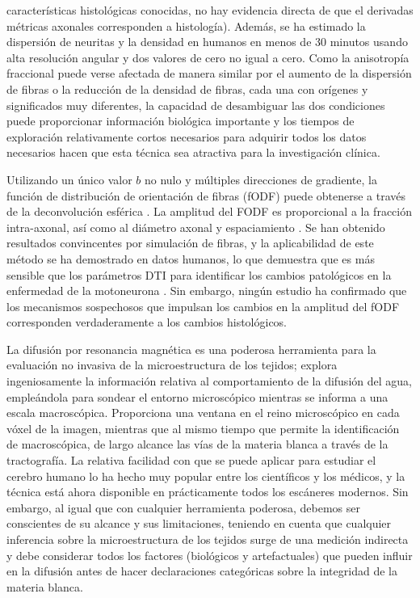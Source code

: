 características histológicas conocidas, no hay evidencia directa de que el derivadas métricas axonales corresponden a histología). Además, se ha estimado la dispersión de neuritas y la densidad \cite{127} en humanos en menos de 30 minutos usando alta resolución angular y dos valores de cero no igual a cero. Como la anisotropía fraccional puede verse afectada de manera similar por el aumento de la dispersión de fibras o la reducción de la densidad de fibras, cada una con orígenes y significados muy diferentes, la capacidad de desambiguar las dos condiciones puede proporcionar información biológica importante y los tiempos de exploración relativamente cortos necesarios para adquirir todos los datos necesarios hacen que esta técnica sea atractiva para la investigación clínica.

Utilizando un único valor $b$ no nulo y múltiples direcciones de gradiente, la función de distribución de orientación de fibras (fODF) puede obtenerse a través de la deconvolución esférica \cite{128}. La amplitud del FODF es proporcional a la fracción intra-axonal, así como al diámetro axonal y espaciamiento \cite{129,130}. Se han obtenido resultados convincentes por simulación de fibras, y la aplicabilidad de este método se ha demostrado en datos humanos, lo que demuestra que es más sensible que los parámetros DTI para identificar los cambios patológicos en la enfermedad de la motoneurona \cite{129}. Sin embargo, ningún estudio ha confirmado que los mecanismos sospechosos que impulsan los cambios en la amplitud del fODF corresponden verdaderamente a los cambios histológicos.

La difusión por resonancia magnética es una poderosa herramienta para la evaluación no invasiva de la microestructura de los tejidos; explora ingeniosamente la información relativa al comportamiento de la difusión del agua, empleándola para sondear el entorno microscópico mientras se informa a una escala macroscópica. Proporciona una ventana en el reino microscópico en cada vóxel de la imagen, mientras que al mismo tiempo que permite la identificación de macroscópica, de largo alcance las vías de la materia blanca a través de la tractografía. La relativa facilidad con que se puede aplicar para estudiar el cerebro humano lo ha hecho muy popular entre los científicos y los médicos, y la técnica está ahora disponible en prácticamente todos los escáneres modernos. Sin embargo, al igual que con cualquier herramienta poderosa, debemos ser conscientes de su alcance y sus limitaciones, teniendo en cuenta que cualquier inferencia sobre la microestructura de los tejidos surge de una medición indirecta y debe considerar todos los factores (biológicos y artefactuales) que pueden influir en la difusión antes de hacer declaraciones categóricas sobre la integridad de la materia blanca.
